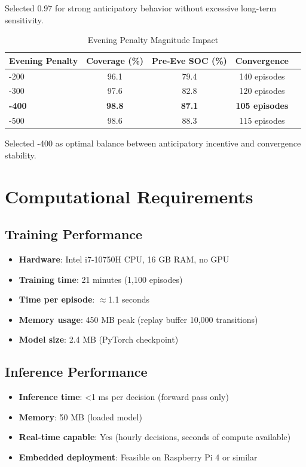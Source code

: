 \documentclass[11pt,a4paper]{article}
\begin{document}
Selected 0.97 for strong anticipatory behavior without excessive long-term sensitivity.

\begin{table}[h]
\centering
\caption{Evening Penalty Magnitude Impact}
\begin{tabular}{lcccc}
\toprule
\textbf{Evening Penalty} & \textbf{Coverage (\%)} & \textbf{Pre-Eve SOC (\%)} & \textbf{Convergence} \\
\midrule
-200 & 96.1 & 79.4 & 140 episodes \\
-300 & 97.6 & 82.8 & 120 episodes \\
\textbf{-400} & \textbf{98.8} & \textbf{87.1} & \textbf{105 episodes} \\
-500 & 98.6 & 88.3 & 115 episodes \\
\bottomrule
\end{tabular}
\end{table}

Selected -400 as optimal balance between anticipatory incentive and convergence stability.

\section{Computational Requirements}
\label{app:computation}

\subsection{Training Performance}

\begin{itemize}
    \item \textbf{Hardware}: Intel i7-10750H CPU, 16 GB RAM, no GPU
    \item \textbf{Training time}: 21 minutes (1,100 episodes)
    \item \textbf{Time per episode}: $\approx$1.1 seconds
    \item \textbf{Memory usage}: 450 MB peak (replay buffer 10,000 transitions)
    \item \textbf{Model size}: 2.4 MB (PyTorch checkpoint)
\end{itemize}

\subsection{Inference Performance}

\begin{itemize}
    \item \textbf{Inference time}: <1 ms per decision (forward pass only)
    \item \textbf{Memory}: 50 MB (loaded model)
    \item \textbf{Real-time capable}: Yes (hourly decisions, seconds of compute available)
    \item \textbf{Embedded deployment}: Feasible on Raspberry Pi 4 or similar
\end{itemize}
\end{document}
